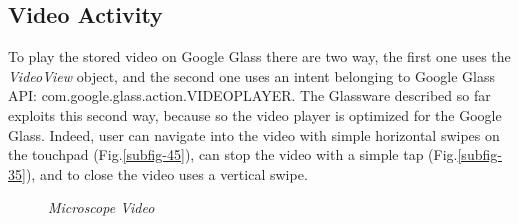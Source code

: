 \subsection{Video Activity}

To play the stored video on Google Glass there are two way, the first one uses the \textit{VideoView} object, and the second one uses an intent belonging to Google Glass API: com.google.glass.action.VIDEOPLAYER. The Glassware described so far exploits this second way, because so the video player is optimized for the Google Glass. Indeed, user can navigate into the video with simple horizontal swipes on the touchpad (Fig.\ref{subfig-45}), can stop the video with a simple tap (Fig.\ref{subfig-35}), and to close the video uses a vertical swipe.

\begin{figure}[h]
	\centering
	
	
	\caption{\textit{Microscope Video}}
	\label{ool}
	
\end{figure}